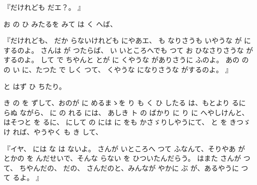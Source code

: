 
『だけれども
だエ？。
』

お
の
ひ
みたるを
みて
は
く
へば、

『だけれども、
だか
らないけれども
にやあエ、
も
なりさうも
いやうな
が
にするのよ。
さんは
が
つたらば、
い
いところへでも
つて
お
ひなさりさうな
がするのよ。
して
で
ちやんと
とが
に
くやうな
がありさうに
ふのよ。
あの
の
の
い
に、たつた
で
しく
つて、
くやうな
になりさうな
がするのよ。
』

と
はず
ひ
ちたり。

き
の
を
ずして、おのが
に
めるまゝを
り%
も
く
ひ
したる
は、もとより
るに
らぬ
ながら、
に
の
れる
には、
あしき
ト
の
ばかり
に
り
に
へやしけんと、
はそつと
を
るに、
にして
の
には
に
をも
かさゞりしやうにて、
と
を
きつゞけ
れば、やうやく
も
き
して、

『イヤ、
には
な
は
ないよ。
さんが
いところへ
つて
ふなんて、そりやあ
が
とかの
を
んだせいで、そんな
らない
を
ひついたんだらう。
はまた
さんが
つて、
ちやんだの、
だの、
さんだのと、みんなが
やかに
ぶ
が、あるやうに
つて
るよ。
』

